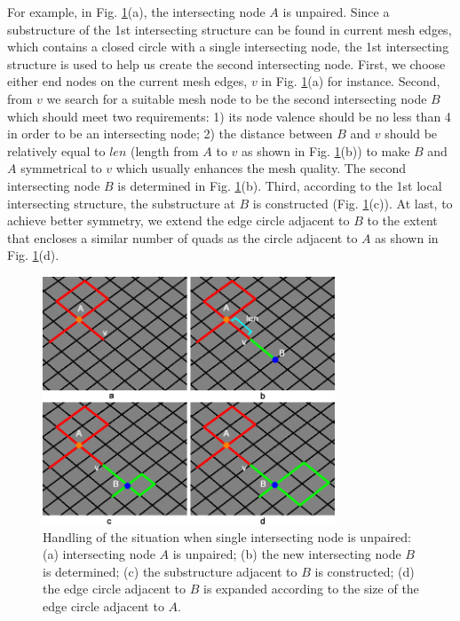 \documentclass[final,5p,times,twocolumn]{elsarticle}
\begin{document}
For example, in Fig. \ref{fig:create_int_node}(a), the intersecting node $A$ is unpaired. Since a substructure of the 1st intersecting structure can be found in current mesh edges, which contains a closed circle with a single intersecting node, the 1st intersecting structure is used to help us create the second intersecting node. First, we choose either end nodes on the current mesh edges, $v$ in Fig. \ref{fig:create_int_node}(a) for instance. Second, from $v$ we search for a suitable mesh node to be the second intersecting node $B$ which should meet two requirements: 1) its node valence should be no less than 4 in order to be an intersecting node; 2) the distance between $B$ and $v$ should be relatively equal to $len$ (length from $A$ to $v$ as shown in Fig. \ref{fig:create_int_node}(b)) to make $B$ and $A$ symmetrical to $v$ which usually enhances the mesh quality. The second intersecting node $B$ is determined in Fig. \ref{fig:create_int_node}(b). Third, according to the 1st local intersecting structure, the substructure at $B$ is constructed (Fig. \ref{fig:create_int_node}(c)). At last, to achieve better symmetry, we extend the edge circle adjacent to $B$ to the extent that encloses a similar number of quads as the circle adjacent to $A$ as shown in Fig. \ref{fig:create_int_node}(d).

\begin{figure}[htbp]
\begin{center}
\includegraphics[width=8.7cm]{create_int_node.png}
\caption{Handling of the situation when single intersecting node is unpaired: (a) intersecting node $A$ is unpaired; (b) the new intersecting node $B$ is determined; (c) the substructure adjacent to $B$ is constructed; (d) the edge circle adjacent to $B$ is expanded according to the size of the edge circle adjacent to $A$.}
\label{fig:create_int_node}
\end{center}
\end{figure}
\end{document}
